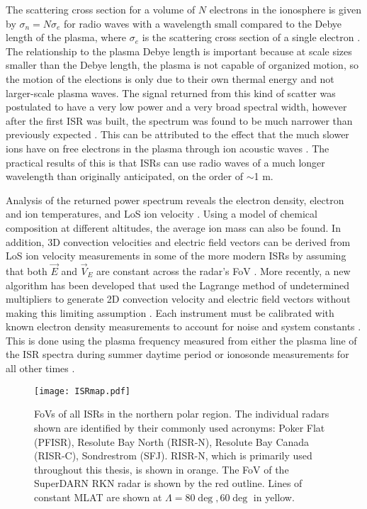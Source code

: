 The scattering cross section for a volume of \(N\) electrons in the ionosphere is given by \(\sigma_n = N \sigma_e\) for radio waves with a wavelength small compared to the Debye length of the plasma, where \(\sigma_e\) is the scattering cross section of a single electron \citep{Gordon1958,Fejer1960}.  The relationship to the plasma Debye length is important because at scale sizes smaller than the Debye length, the plasma is not capable of organized motion, so the motion of the elections is only due to their own thermal energy and not larger-scale plasma waves.  The signal returned from this kind of scatter was postulated to have a very low power and a very broad spectral width, however after the first ISR was built, the spectrum was found to be much narrower than previously expected \citep{Evans1969}.  This can be attributed to the effect that the much slower ions have on free electrons in the plasma through ion acoustic waves \citep{Bowles1958}.  The practical results of this is that ISRs can use radio waves of a much longer wavelength than originally anticipated, on the order of \(\sim\)1 m.

Analysis of the returned power spectrum reveals the electron density, electron and ion temperatures, and LoS ion velocity \citep{Evans1969,Rishbeth1985,Nicolls2007a}.  Using a model of chemical composition at different altitudes, the average ion mass can also be found.  In addition, 3D convection velocities and electric field vectors can be derived from LoS ion velocity measurements in some of the more modern ISRs by assuming that both \(\vec{E}\) and \(\vec{V}_E\) are constant across the radar's FoV \citep{Heinselman2008}.  More recently, a new algorithm has been developed that used the Lagrange method of undetermined multipliers to generate 2D convection velocity and electric field vectors without making this limiting assumption \citep{Nicolls2014}.  Each instrument must be calibrated with known electron density measurements to account for noise and system constants \citep{Nicolls2007a}.  This is done using the plasma frequency measured from either the plasma line of the ISR spectra during summer daytime period or ionosonde measurements for all other times \citep{Bahcivan2010,Themens2014}.

\begin{figure}
	\centering
	\texttt{[image: ISRmap.pdf]}
	\caption[ISR map]{FoVs of all ISRs in the northern polar region.  The individual radars shown are identified by their commonly used acronyms: Poker Flat (PFISR), Resolute Bay North (RISR-N), Resolute Bay Canada (RISR-C), Sondrestrom (SFJ).  RISR-N, which is primarily used throughout this thesis, is shown in orange.  The FoV of the SuperDARN RKN radar is shown by the red outline.  Lines of constant MLAT are shown at \(\Lambda=80\deg,60\deg\) in yellow.}
	\label{fig:isrmap}
\end{figure}

